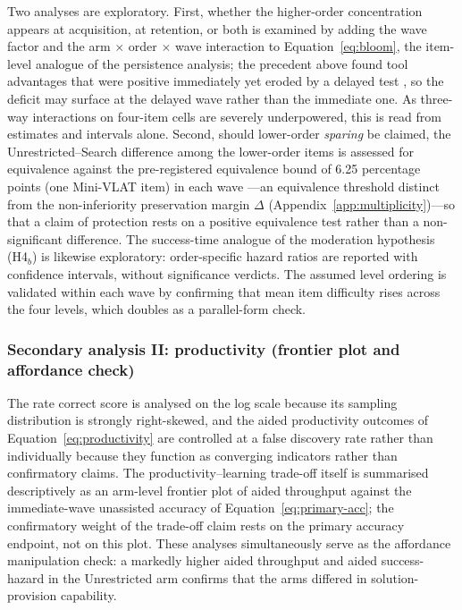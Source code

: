 Two analyses are exploratory. First, whether the higher-order concentration appears at acquisition, at retention, or both is examined by adding the wave factor and the arm $\times$ order $\times$ wave interaction to Equation~\eqref{eq:bloom}, the item-level analogue of the persistence analysis; the precedent above found tool advantages that were positive immediately yet eroded by a delayed test \parencite{akgun2025}, so the deficit may surface at the delayed wave rather than the immediate one. As three-way interactions on four-item cells are severely underpowered, this is read from estimates and intervals alone. Second, should lower-order \emph{sparing} be claimed, the Unrestricted--Search difference among the lower-order items is assessed for equivalence against the pre-registered equivalence bound of 6.25 percentage points (one Mini-VLAT item) in each wave \parencite{lakens2017,lakens2018}---an equivalence threshold distinct from the non-inferiority preservation margin $\Delta$ (Appendix~\ref{app:multiplicity})---so that a claim of protection rests on a positive equivalence test rather than a non-significant difference. %
The success-time analogue of the moderation hypothesis (H4$_b$) is likewise exploratory: order-specific hazard ratios are reported with confidence intervals, without significance verdicts. The assumed level ordering is validated within each wave by confirming that mean item difficulty rises across the four levels, which doubles as a parallel-form check.

\subsubsection{Secondary analysis II: productivity (frontier plot and affordance check)}
\label{app:productivity}
The rate correct score is analysed on the log scale because its sampling distribution is strongly right-skewed, and the aided productivity outcomes of Equation~\eqref{eq:productivity} are controlled at a false discovery rate \parencite{benjamini1995} rather than individually because they function as converging indicators rather than confirmatory claims. The productivity--learning trade-off itself is summarised descriptively as an arm-level frontier plot of aided throughput against the immediate-wave unassisted accuracy of Equation~\eqref{eq:primary-acc}; the confirmatory weight of the trade-off claim rests on the primary accuracy endpoint, not on this plot. These analyses simultaneously serve as the affordance manipulation check: a markedly higher aided throughput and aided success-hazard in the Unrestricted arm confirms that the arms differed in solution-provision capability.

